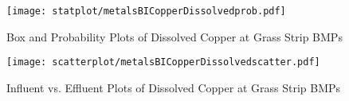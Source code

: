         \begin{figure}[hb]   %
            \centering
            \texttt{[image: statplot/metalsBICopperDissolvedprob.pdf]}
            \caption{Box and Probability Plots of Dissolved Copper at Grass Strip BMPs}
        \end{figure}         %
        
        
        \begin{figure}[hb]   %
            \centering
            \texttt{[image: scatterplot/metalsBICopperDissolvedscatter.pdf]}
            \caption{Influent vs. Effluent Plots of Dissolved Copper at Grass Strip BMPs}
        \end{figure}         %
        \clearpage
        